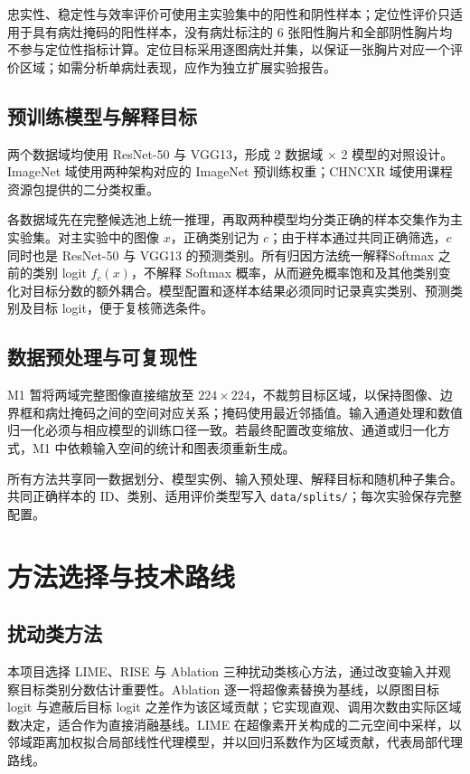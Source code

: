 忠实性、稳定性与效率评价可使用主实验集中的阳性和阴性样本；定位性评价只适用于具有病灶掩码的阳性样本，没有病灶标注的 6 张阳性胸片和全部阴性胸片均不参与定位性指标计算。定位目标采用逐图病灶并集，以保证一张胸片对应一个评价区域；如需分析单病灶表现，应作为独立扩展实验报告。

\section{预训练模型与解释目标}

两个数据域均使用 ResNet-50 与 VGG13，形成 2 数据域 $\times$ 2 模型的对照设计。ImageNet 域使用两种架构对应的 ImageNet 预训练权重；CHNCXR 域使用课程资源包提供的二分类权重。

各数据域先在完整候选池上统一推理，再取两种模型均分类正确的样本交集作为主实验集。对主实验中的图像 $x$，正确类别记为 $c$；由于样本通过共同正确筛选，$c$ 同时也是 ResNet-50 与 VGG13 的预测类别。所有归因方法统一解释Softmax 之前的类别 logit $f_c(x)$，不解释 Softmax 概率，从而避免概率饱和及其他类别变化对目标分数的额外耦合。模型配置和逐样本结果必须同时记录真实类别、预测类别及目标 logit，便于复核筛选条件。

\section{数据预处理与可复现性}

M1 暂将两域完整图像直接缩放至 $224\times224$，不裁剪目标区域，以保持图像、边界框和病灶掩码之间的空间对应关系；掩码使用最近邻插值。输入通道处理和数值归一化必须与相应模型的训练口径一致。若最终配置改变缩放、通道或归一化方式，M1 中依赖输入空间的统计和图表须重新生成。

所有方法共享同一数据划分、模型实例、输入预处理、解释目标和随机种子集合。共同正确样本的 ID、类别、适用评价类型写入 \texttt{data/splits/}；每次实验保存完整配置。

\chapter{方法选择与技术路线}

\section{扰动类方法}

本项目选择 LIME、RISE 与 Ablation 三种扰动类核心方法，通过改变输入并观察目标类别分数估计重要性\cite{covert2021removing}。Ablation 逐一将超像素替换为基线，以原图目标 logit 与遮蔽后目标 logit 之差作为该区域贡献；它实现直观、调用次数由实际区域数决定，适合作为直接消融基线。LIME\cite{ribeiro2016lime} 在超像素开关构成的二元空间中采样，以邻域距离加权拟合局部线性代理模型，并以回归系数作为区域贡献，代表局部代理路线。

